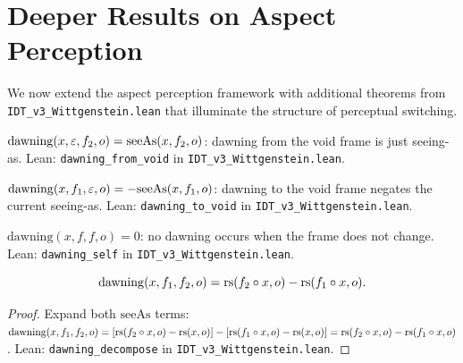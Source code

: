 \section{Deeper Results on Aspect Perception}

We now extend the aspect perception framework with additional theorems from
\texttt{IDT\_v3\_Wittgenstein.lean} that illuminate the structure of perceptual
switching.

\begin{theorem}
\label{thm:dawning-from-void}
$\mathrm{dawning}(x, \varepsilon, f_2, o) = \mathrm{seeAs}(x, f_2, o)$:
dawning from the void frame is just seeing-as.
Lean: \texttt{dawning\_from\_void} in \texttt{IDT\_v3\_Wittgenstein.lean}.
\end{theorem}

\begin{theorem}
\label{thm:dawning-to-void}
$\mathrm{dawning}(x, f_1, \varepsilon, o) = -\mathrm{seeAs}(x, f_1, o)$:
dawning to the void frame negates the current seeing-as.
Lean: \texttt{dawning\_to\_void} in \texttt{IDT\_v3\_Wittgenstein.lean}.
\end{theorem}

\begin{theorem}
\label{thm:dawning-self}
$\mathrm{dawning}(x, f, f, o) = 0$: no dawning occurs when the frame does
not change.
Lean: \texttt{dawning\_self} in \texttt{IDT\_v3\_Wittgenstein.lean}.
\end{theorem}

\begin{theorem}
\label{thm:dawning-decompose}
\[
\mathrm{dawning}(x, f_1, f_2, o) = \mathrm{rs}(f_2 \circ x, o) - \mathrm{rs}(f_1 \circ x, o).
\]
\end{theorem}

\begin{proof}
Expand both $\mathrm{seeAs}$ terms: $\mathrm{dawning}(x, f_1, f_2, o)
= [\mathrm{rs}(f_2 \circ x, o) - \mathrm{rs}(x, o)] - [\mathrm{rs}(f_1 \circ x, o) - \mathrm{rs}(x, o)]
= \mathrm{rs}(f_2 \circ x, o) - \mathrm{rs}(f_1 \circ x, o)$.
Lean: \texttt{dawning\_decompose} in \texttt{IDT\_v3\_Wittgenstein.lean}.
\end{proof}

